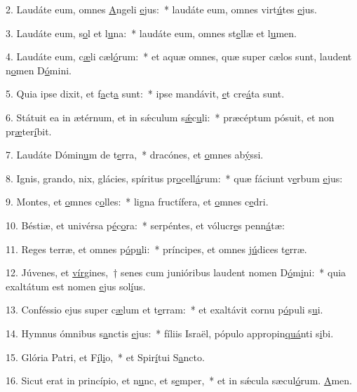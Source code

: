 2. Laudáte eum, omnes \uline{A}ngeli \uline{e}jus:~* laudáte eum, omnes virt\uline{ú}tes \uline{e}jus.\par 
3. Laudáte eum, s\uline{o}l et l\uline{u}na:~* laudáte eum, omnes st\uline{e}llæ et l\uline{u}men.\par 
4. Laudáte eum, c\uline{æ}li cæl\uline{ó}rum:~* et aquæ omnes, quæ super cælos sunt, laudent n\uline{o}men D\uline{ó}mini.\par 
5. Quia ipse dixit, et f\uline{a}ct\uline{a} sunt:~* ipse mandávit, \uline{e}t cre\uline{á}ta sunt.\par 
6. Státuit ea in ætérnum, et in sǽculum s\uline{ǽ}c\uline{u}li:~* præcéptum pósuit, et non pr\uline{æ}ter\uline{í}bit.\par 
7. Laudáte Dómin\uline{u}m de t\uline{e}rra,~* dracónes, et \uline{o}mnes ab\uline{ý}ssi.\par 
8. Ignis, grando, nix, glácies, spíritus pr\uline{o}cell\uline{á}rum:~* quæ fáciunt v\uline{e}rbum \uline{e}jus:\par 
9. Montes, et \uline{o}mnes c\uline{o}lles:~* ligna fructífera, et \uline{o}mnes c\uline{e}dri.\par 
10. Béstiæ, et univérsa p\uline{é}c\uline{o}ra:~* serpéntes, et vólucr\uline{e}s penn\uline{á}tæ:\par 
11. Reges terræ, et omnes p\uline{ó}p\uline{u}li:~* príncipes, et omnes j\uline{ú}dices t\uline{e}rræ.\par 
12. Júvenes, et \uline{vír}gines,~† senes cum junióribus laudent nomen D\uline{ó}m\uline{i}ni:~* quia exaltátum est nomen \uline{e}jus sol\uline{í}us.\par 
13. Conféssio ejus super c\uline{æ}lum et t\uline{e}rram:~* et exaltávit cornu p\uline{ó}puli s\uline{u}i.\par 
14. Hymnus ómnibus s\uline{a}nctis \uline{e}jus:~* fíliis Israël, pópulo appropin\uline{quá}nti s\uline{i}bi.\par 
15. Glória Patri, et F\uline{í}l\uline{i}o,~* et Spir\uline{í}tui S\uline{a}ncto.\par 
16. Sicut erat in princípio, et n\uline{u}nc, et s\uline{e}mper,~* et in sǽcula sæcul\uline{ó}rum. \uline{A}men.\par 
